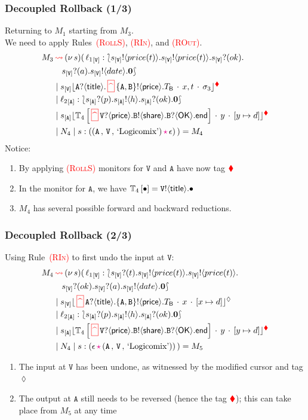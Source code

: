 \documentclass[12pt]{beamer}
\newcommand{\myctxr}[2]{{#1\left[\textcolor{black}{#2}\right]}}
\newcommand{\pS}{\ensuremath{\mathtt{V}}\xspace}
\newcommand{\epS}{\ep{s}{\mathtt{V}}}
\newcommand{\bkcolor}[1]{\textcolor{red}{#1}}
\newcommand{\sepcolor}[1]{\textcolor{magenta}{#1}}
\newcommand{\upd}[2]{[#1\mapsto #2]}
\newcommand{\sred}[1]{\textcolor{myred}{#1}}
\newcommand{\news}[1]{(\nu\, #1)}
\newcommand{\bi}{\begin{enumerate}[$\bullet$]}
\newcommand{\ei}{\end{enumerate}}
\newcommand{\queue}[1]{\lfloor #1 \rfloor}
\newcommand{\store}{\sigma}
\newcommand{\ctx}[1]{\mathbb{#1}}
\newcommand{\mysepp}{\,\cdot\,}
\newcommand{\codah}[4]{\coda{#1}{(#2\,\history\,#3)\!#4}}
\newcommand{\history}{\sepcolor{\mathbf{\star}}}
\newcommand{\coda}[2]{#1:#2}
\newcommand{\lend}{\mathsf{end}}
\newcommand{\gpart}[1]{\mathtt{#1}}
\newcommand{\hmoni}[4]{\ensuremath{{#1\queue{\textcolor{black}{#2}\mysepp #3\mysepp #4}^{\normark}}}}
\newcommand{\monir}[4]{\ensuremath{{#1\queue{\textcolor{black}{#2}\mysepp #3\mysepp #4}^{\bkcolor{\rmark}}}}}
\newcommand{\past}{\,\text{\textcolor{red}{\textbf{\textasciicircum}}}\,}
\newcommand{\mypast}{\,\sred{\framebox[3mm]{\past}\,}}
\newcommand{\conf}[2]{\lbag #2 \rbag} %
\newcommand{\ltout}[3]{\gpart{#1}!\langle#2\rangle.#3}
\newcommand{\ltinp}[3]{\gpart{#1}?\langle#2\rangle.#3}
\newcommand{\outses}{!}
\newcommand{\inpses}{?}
\newcommand{\Par}{\;|\;}
\newcommand{\emp}{\epsilon}
\newcommand{\valueq}[3]{(#1 \,,\, #2 \,,\,#3)}
\newcommand{\freev}[1]{\langle #1\rangle}
\newcommand{\boundv}[1]{(#1)}
\newcommand{\shsep}{.}
\newcommand{\bout}[2]{#1 \outses \freev{#2} \shsep}
\newcommand{\binp}[2]{#1 \inpses \boundv{#2} \shsep}
\newcommand{\bk}{\ensuremath{\bkcolor{\,\rightsquigarrow\,}}}
\newcommand{\key}[2]{#1_{[#2]}}
\newcommand{\np}[2]{#1:#2}
\newcommand{\ep}[2]{#1_{[#2]}}
\newcommand{\loc}{\ell}
\newcommand{\rmark}{\bkcolor{\blacklozenge}}
\newcommand{\normark}{\lozenge}
\newcommand{\inact}{\mathbf{0}}
\newcommand{\epA}{\ep{s}{\mathtt{A}}}
\newcommand{\pA}{\ensuremath{\mathtt{A}}\xspace}
\newcommand{\exBook}{\text{`Logicomix'}}
\begin{document}
\begin{frame}
\frametitle{Decoupled Rollback (1/3)}
Returning to $M_1$ starting from $M_3$. \\
We need to apply Rules~\bkcolor{\textsc{(RollS)}}, \bkcolor{\textsc{(RIn)}}, and \bkcolor{\textsc{(ROut)}}.
\begin{align*}
M_3 & \bk  \news{s}(\,  
\np{\key{{\loc_1}}{\pS}}{ \conf{\inact}{\bout{\epS}{price(t)}\bout{\epS}{price(t)}\binp{\epS}{ok} \\ 
& \quad  \binp{\epS}{a} \bout{\epS}{date}\inact }} 
\\
& \Par 
 \monir{\ep{s}{\pS}}{\ltinp{A}{\mathsf{title}}{\mypast \ltout{\{A,B\}}{\mathsf{price}}{T_\mathsf{B}}}}{x,t}{\store_3} 
\\
& \Par \np{\key{{\loc_2}}{\pA}}{ \conf{\inact}{\binp{\epA}{p}\bout{\epA}{h}\binp{\epA}{ok}\inact}} 
\\
& \Par 
\monir{\ep{s}{\pA}}{\myctxr{\ctx{T}_4}{\mypast \ltinp{\pS}{\mathsf{price}}{\ltout{B}{\mathsf{share}}{\ltinp{B}{\mathsf{OK}}{\lend}}}}}{y}{\upd{y}{d}} 
\\
& \Par N_4 \Par \codah{s}{\valueq{\pA}{\pS}{\exBook}}{\emp}{}~)  = M_4
\end{align*}
Notice:
\bi
\item By applying \bkcolor{\textsc{(RollS)}} monitors for \pS and \pA have now tag $\rmark$
\item In the monitor for \pA, we have $\myctxr{\ctx{T}_4}{\bullet}  =\ltout{\pS}{\mathsf{title}}{\bullet}$ 
\item $M_4$ has several possible forward and backward reductions.
\ei
\end{frame}

\begin{frame}
\frametitle{Decoupled Rollback (2/3)}
Using Rule~\bkcolor{\textsc{(RIn)}} to first undo the input at \pS:
\begin{align*}
M_4 & \bk  \news{s}(\,  
\np{\key{{\loc_1}}{\pS}}{ \conf{\inact}{\binp{\epS}{t}\bout{\epS}{price(t)}\bout{\epS}{price(t)} \\ 
& \quad  \binp{\epS}{ok}\binp{\epS}{a} \bout{\epS}{date}\inact }} 
\\
& \Par 
 \hmoni{\ep{s}{\pS}}{\mypast \ltinp{A}{\mathsf{title}}{\ltout{\{A,B\}}{\mathsf{price}}{T_\mathsf{B}}}}{x}{\upd{x}{d}} 
\\
& \Par \np{\key{{\loc_2}}{\pA}}{ \conf{\inact}{\binp{\epA}{p}\bout{\epA}{h}\binp{\epA}{ok}\inact}} 
\\
& \Par 
\monir{\ep{s}{\pA}}{\myctxr{\ctx{T}_4}{\mypast \ltinp{\pS}{\mathsf{price}}{\ltout{B}{\mathsf{share}}{\ltinp{B}{\mathsf{OK}}{\lend}}}}}{y}{\upd{y}{d}} 
\\
& \Par N_4 \Par \codah{s}{\emp}{\valueq{\pA}{\pS}{\exBook}}{}~)  = M_5
\end{align*}
\bi
\item The input at $\pS$ has been undone, as witnessed by the modified cursor and tag $\normark$
\item The output at $\pA$ still needs to be reversed (hence the tag $\rmark$); this can take place from $M_5$ at any time 
\ei
\end{frame}
\end{document}
